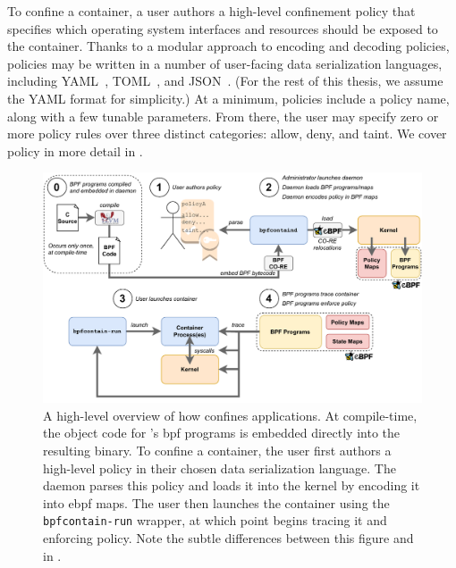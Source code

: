 To confine a container, a user authors a high-level confinement policy that specifies
which operating system interfaces and resources should be exposed to the container.
Thanks to a modular approach to encoding and decoding policies, \bpfcontain{} policies may
be written in a number of user-facing data serialization languages, including
YAML~\cite{yaml}, TOML~\cite{toml}, and JSON~\cite{json}. (For the rest of this thesis, we
assume the YAML format for simplicity.) At a minimum, \bpfcontain{} policies include
a policy name, along with a few tunable parameters. From there, the user may specify zero
or more policy rules over three distinct categories: allow, deny, and taint. We cover
\bpfcontain{} policy in more detail in .

\begin{figure}[htpb]
  \centering
  \includegraphics[width=1\linewidth]{figs/bpfcontain/overview.pdf}
  \caption[A high-level overview of how \bpfcontain{} confines applications]{
    A high-level overview of how \bpfcontain{} confines applications.  At compile-time,
    the object code for \bpfcontain{}'s \gls{bpf} programs is embedded directly into the
    resulting binary. To confine a container, the user first authors a high-level policy
    in their chosen data serialization language. The daemon parses this policy and loads
    it into the kernel by encoding it into \gls{ebpf} maps. The user then launches the
    container using the \texttt{bpfcontain-run} wrapper, at which point \bpfcontain{}
    begins tracing it and enforcing policy. Note the subtle differences between this
    figure and  in .
  }%
  \label{fig:bpfcontain-overview}
\end{figure}

